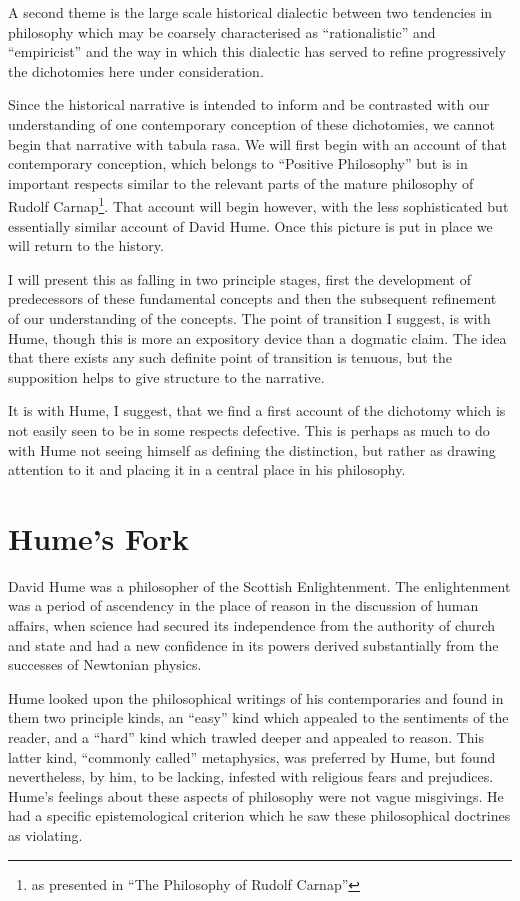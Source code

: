 A second theme is the large scale historical dialectic between two
tendencies in philosophy which may be coarsely characterised as
``rationalistic'' and ``empiricist'' and the way in which this
dialectic has served to refine progressively the dichotomies here
under consideration.

Since the historical narrative is intended to inform and be contrasted
with our understanding of one contemporary conception of these
dichotomies, we cannot begin that narrative with tabula rasa.
We will first begin with an account of that contemporary conception,
which belongs to ``Positive Philosophy'' but is in important respects
similar to the relevant parts of the mature philosophy of Rudolf
Carnap\footnote{as presented in ``The Philosophy of Rudolf
Carnap''\cite{schilpp63}}.
That account will begin however, with the less sophisticated but
essentially similar account of David Hume.
Once this picture is put in place we will return to the history.

I will present this as falling in two principle stages, first the
development of predecessors of these fundamental concepts and then the
subsequent refinement of our understanding of the concepts.
The point of transition I suggest, is with Hume, though this is more
an expository device than a dogmatic claim.
The idea that there exists any such definite point of transition is
tenuous, but the supposition helps to give structure to the narrative.

It is with Hume, I suggest, that we find a first account of the
dichotomy which is not easily seen to be in some respects defective. 
This is perhaps as much to do with Hume not seeing himself as defining
the distinction, but rather as drawing attention to it and placing it
in a central place in his philosophy. 

\section{Hume's Fork}\label{HumesFork}

David Hume was a philosopher of the Scottish Enlightenment.
The enlightenment was a period of ascendency in the place of reason in
the discussion of human affairs, when science had secured its
independence from the authority of church and state and had a new
confidence in its powers derived substantially from the successes of
Newtonian physics.

Hume looked upon the philosophical writings of his contemporaries and
found in them two principle kinds, an ``easy'' kind which appealed to
the sentiments of the reader, and a ``hard'' kind which trawled deeper
and appealed to reason.
This latter kind, ``commonly called'' metaphysics, was preferred by
Hume, but found nevertheless, by him, to be lacking, infested with religious 
fears and prejudices.
Hume's feelings about these aspects of philosophy were not vague
misgivings.
He had a specific epistemological criterion which he saw these
philosophical doctrines as violating.

